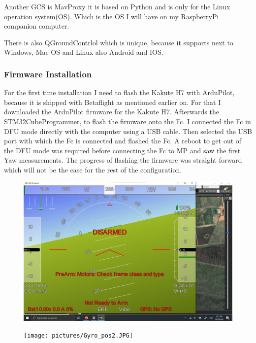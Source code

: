 \documentclass{article}
\begin{document}
	Another GCS is MavProxy it is based on Python and is only for the Linux operation system(OS). Which is the OS I will have on my RaspberryPi companion computer. 
	
	There is also QGroundContrlol which is unique, because it supports next to Windows, Mac OS and Linux also Android and IOS.

	\subsubsection{Firmware Installation}
	
	For the first time installation I need to flash the Kakute H7 with ArduPilot, because it is shipped with Betaflight as mentioned earlier on. For that I downloaded the ArduPilot firmware\cite{ArduPilotFirmware} for the Kakute H7. Afterwards the STM32CubeProgrammer\cite{STM32CubeProgrammer}, to flash the firmware onto the Fc. I connected the Fc in DFU mode directly with the computer using a USB cable. Then selected the USB port with which the Fc is connected and flashed the Fc. A reboot to get out of the DFU mode was required before connecting the Fc to MP and saw the first Yaw measurements. The progress of flashing the firmware was straight forward which will not be the case for the rest of the configuration. 

\begin{figure}[h]
	\centering
	\includegraphics[width=0.7\linewidth]{pictures/Gyro_pos2_large}
	\caption{}
	\label{fig:gyropos2large}
\end{figure}
\begin{figure}[h]
	\centering
	\texttt{[image: pictures/Gyro\_pos2.JPG]}
	\caption{}
	\label{fig:gyropos2}
\end{figure}
\end{document}
